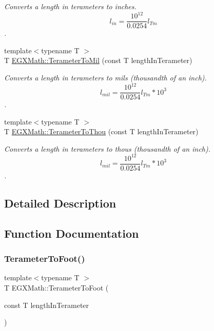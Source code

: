 \begin{DoxyCompactItemize}
\begin{DoxyCompactList}\small\item\em Converts a length in terameters to inches. \[ l_{in}= \frac{10^{12}}{0.0254} l_{Tm} \]. \end{DoxyCompactList}\item 
{\footnotesize template$<$typename T $>$ }\\T \mbox{\hyperlink{group___e_g_x_math-_conversions-_length_conversions-_s_i-_terameter-_imperial_ga9ae6fa58a9800d91e89f76e68838fa86}{E\+G\+X\+Math\+::\+Terameter\+To\+Mil}} (const T length\+In\+Terameter)
\begin{DoxyCompactList}\small\item\em Converts a length in terameters to mils (thousandth of an inch). \[ l_{mil}= \frac{10^{12}}{0.0254} l_{Tm} * 10^{3} \]. \end{DoxyCompactList}\item 
{\footnotesize template$<$typename T $>$ }\\T \mbox{\hyperlink{group___e_g_x_math-_conversions-_length_conversions-_s_i-_terameter-_imperial_ga3e00f52eb5c96d53031f36d7003a0e5e}{E\+G\+X\+Math\+::\+Terameter\+To\+Thou}} (const T length\+In\+Terameter)
\begin{DoxyCompactList}\small\item\em Converts a length in terameters to thous (thousandth of an inch). \[ l_{mil}= \frac{10^{12}}{0.0254} l_{Tm} * 10^{3} \]. \end{DoxyCompactList}\end{DoxyCompactItemize}


\subsection{Detailed Description}


\subsection{Function Documentation}
\mbox{\label{group___e_g_x_math-_conversions-_length_conversions-_s_i-_terameter-_imperial_gaf903b744223a3acb964367da6f14b96f}} 
\subsubsection{\texorpdfstring{Terameter\+To\+Foot()}{TerameterToFoot()}}
{\footnotesize\ttfamily template$<$typename T $>$ \\
T E\+G\+X\+Math\+::\+Terameter\+To\+Foot (\begin{DoxyParamCaption}\item[{const T}]{length\+In\+Terameter }\end{DoxyParamCaption})}



